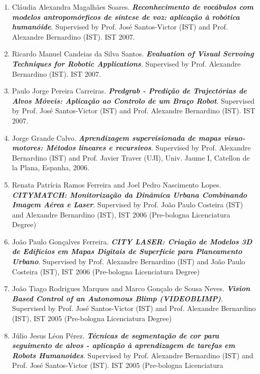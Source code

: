 \begin{enumerate}
{{  omnidirectional camera and particle filters}}. Supervised by Prof.
  Matteo Matteucci (Politecnico di Milano) and Prof. Alexandre
  Bernardino (IST). Politecnico di Milano 2008.
\item
  Cláudia Alexandra Magalhães Soares. \emph{\textbf{Reconhecimento de
  vocábulos com modelos antropomórficos de síntese de voz: aplicação à
  robótica humanóide}}. Supervised by Prof. José Santos-Victor (IST) and
  Prof. Alexandre Bernardino (IST). IST 2007.
\item
  Ricardo Manuel Candeias da Silva Santos. \emph{\textbf{Evaluation of
  Visual Servoing Techniques for Robotic Applications}}. Supervised by
  Prof. Alexandre Bernardino (IST). IST 2007.
\item
  Paulo Jorge Pereira Carreiras. \emph{\textbf{Predgrab - Predição de
  Trajectórias de Alvos Móveis: Aplicação ao Controlo de um Braço
  Robot}}. Supervised by Prof. José Santos-Victor (IST) and Prof.
  Alexandre Bernardino (IST). IST 2007.
\item
  Jorge Grande Calvo. \emph{\textbf{Aprendizagem supervisionada de mapas
  visuo-motores: Métodos lineares e recursivos}}. Supervised by Prof.
  Alexandre Bernardino (IST) and Prof. Javier Traver (UJI), Univ. Jaume
  I, Catellon de la Plana, Espanha, 2006.
\item
  Renata Patrícia Ramos Ferreira and Joel Pedro Nascimento Lopes.
  \emph{\textbf{CITYMATCH: Monitorização da Dinâmica Urbana Combinando
  Imagem Aérea e Laser}}. Supervised by Prof. João Paulo Costeira (IST)
  and Alexandre Bernardino (IST), IST 2006 (Pre-bologna Licenciatura
  Degree)
\item
  João Paulo Gonçalves Ferreira. \emph{\textbf{CITY LASER: Criação de
  Modelos 3D de Edifícios em Mapas Digitais de Superfície para
  Planeamento Urbano}}. Supervised by Prof. Alexandre Bernardino (IST)
  and João Paulo Costeira (IST), IST 2006 (Pre-bologna Licenciatura
  Degree)
\item
  João Tiago Rodrigues Marques and Marco Gonçalo de Sousa Neves.
  \emph{\textbf{Vision Based Control of an Autonomous Blimp
  (VIDEOBLIMP)}}. Supervised by Prof. José Santos-Victor (IST) and Prof.
  Alexandre Bernardino (IST), IST 2005 (Pre-bologna Licenciatura Degree)
\item
  Júlio Jesus Léon Pérez. \emph{\textbf{Técnicas de segmentação de cor
  para seguimento de alvos - aplicação à aprendizagem de tarefas em
  Robots Humanoides}}. Supervised by Prof. Alexandre Bernardino (IST)
  and Prof. José Santos-Victor (IST). IST 2005 (Pre-bologna Licenciatura

\end{enumerate}
